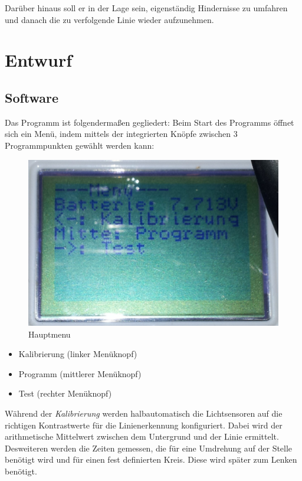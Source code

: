 \documentclass[a4paper]{article}
\begin{document}
Darüber hinaus soll er in der Lage sein, eigenständig Hindernisse zu
umfahren und danach die zu verfolgende Linie wieder aufzunehmen.

\section{Entwurf}

\subsection{Software}
Das Programm ist folgendermaßen gegliedert: Beim Start des
Programms öffnet sich ein Menü, indem mittels der integrierten
Knöpfe zwischen 3 Programmpunkten gewählt werden kann:

\begin{figure}[b]
  \centering
  \caption{Hauptmenu}
  \includegraphics[scale=0.15]{mainscreen.jpg}
\end{figure}

\begin{itemize}
\item Kalibrierung (linker Menüknopf)
\item Programm (mittlerer Menüknopf)
\item Test (rechter Menüknopf)
\end{itemize}

Während der \emph{Kalibrierung} werden halbautomatisch die
Lichtsensoren auf die richtigen Kontrastwerte für die
Linienerkennung konfiguriert. Dabei wird der arithmetische Mittelwert zwischen dem
Untergrund und der Linie ermittelt. Desweiteren werden die Zeiten
gemessen, die für eine Umdrehung auf der Stelle benötigt wird und für
einen fest definierten Kreis. Diese wird später zum Lenken benötigt.
\end{document}
